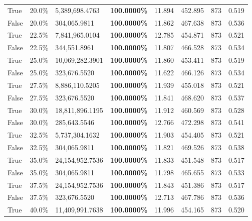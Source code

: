 \begin{table}[H]
{\begin{tabular}{lllrllll}
\cline{1-8}
True & 20.0\% & 5,389,698.4763 & \bfseries \color{red} 100.0000\% & 11.894 & 452.895 & 873 & 0.519 \\
\cline{1-8}
False & 20.0\% & 304,065.9811 & \bfseries \color{red} 100.0000\% & 11.862 & 467.638 & 873 & 0.536 \\
\cline{1-8}
True & 22.5\% & 7,841,965.0104 & \bfseries \color{red} 100.0000\% & 12.785 & 454.871 & 873 & 0.521 \\
\cline{1-8}
False & 22.5\% & 344,551.8961 & \bfseries \color{red} 100.0000\% & 11.807 & 466.528 & 873 & 0.534 \\
\cline{1-8}
True & 25.0\% & 10,069,282.3901 & \bfseries \color{red} 100.0000\% & 11.860 & 453.411 & 873 & 0.519 \\
\cline{1-8}
False & 25.0\% & 323,676.5520 & \bfseries \color{red} 100.0000\% & 11.622 & 466.126 & 873 & 0.534 \\
\cline{1-8}
True & 27.5\% & 8,886,110.5205 & \bfseries \color{red} 100.0000\% & 11.939 & 455.018 & 873 & 0.521 \\
\cline{1-8}
False & 27.5\% & 323,676.5520 & \bfseries \color{red} 100.0000\% & 11.841 & 468.620 & 873 & 0.537 \\
\cline{1-8}
True & 30.0\% & 18,811,896.1195 & \bfseries \color{red} 100.0000\% & 11.912 & 460.569 & 873 & 0.528 \\
\cline{1-8}
False & 30.0\% & 285,643.5546 & \bfseries \color{red} 100.0000\% & 12.766 & 472.298 & 873 & 0.541 \\
\cline{1-8}
True & 32.5\% & 5,737,304.1632 & \bfseries \color{red} 100.0000\% & 11.903 & 454.405 & 873 & 0.521 \\
\cline{1-8}
False & 32.5\% & 304,065.9811 & \bfseries \color{red} 100.0000\% & 11.821 & 469.526 & 873 & 0.538 \\
\cline{1-8}
True & 35.0\% & 24,154,952.7536 & \bfseries \color{red} 100.0000\% & 11.833 & 451.548 & 873 & 0.517 \\
\cline{1-8}
False & 35.0\% & 304,065.9811 & \bfseries \color{red} 100.0000\% & 11.798 & 465.655 & 873 & 0.533 \\
\cline{1-8}
True & 37.5\% & 24,154,952.7536 & \bfseries \color{red} 100.0000\% & 11.843 & 451.386 & 873 & 0.517 \\
\cline{1-8}
False & 37.5\% & 323,676.5520 & \bfseries \color{red} 100.0000\% & 12.713 & 467.786 & 873 & 0.536 \\
\cline{1-8}
True & 40.0\% & 11,409,991.7638 & \bfseries \color{red} 100.0000\% & 11.996 & 454.165 & 873 & 0.520 \\

\end{tabular}}
\end{table}
